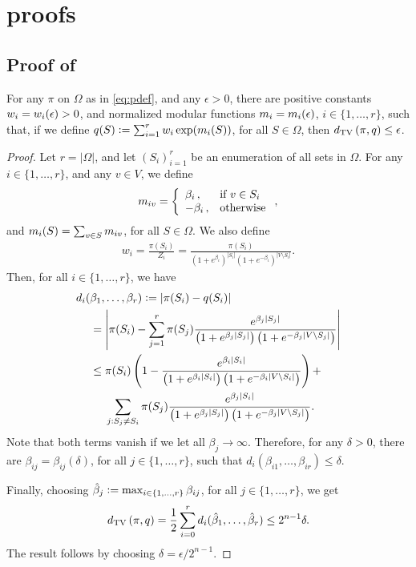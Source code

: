 \chapter{\Ms{} proofs}

\section{Proof of }

\setcounter{lemma}{0}
\begin{prop}
  For any $\pi$ on $\Omega$ as in \eqref{eq:pdef}, and any $\epsilon > 0$, there are positive constants $w_i = w_i(\epsilon) > 0$, and normalized modular functions $m_i = m_i(\epsilon)$, $i \in \{1, \ldots, r\}$, such that, if we define $q(S) \vcentcolon= \sum_{i = 1}^r w_i \exp(m_i(S))$, for all $S \in \Omega$, then $d_{\textrm{TV}}\left( \pi, q \right) \leq \epsilon$.
\end{prop}

\begin{proof}
  Let $r = |\Omega|$, and let $\left( S_i \right)_{i = 1}^r$ be an enumeration of all sets in $\Omega$.
  For any $i \in \{1, \ldots, r\}$, and any $v \in V$, we define
  \begin{align*}
    m_{iv} = \left\{ \begin{array}{ll} \beta_i\,,& \mbox{if } v \in S_i \\ -\beta_i\,,& \mbox{otherwise} \end{array} \right.,
  \end{align*}
  and $m_i(S) = \sum_{v \in S} m_{iv}$, for all $S \in \Omega$.
  We also define
  \begin{align*}
    w_i = \frac{\pi(S_i)}{Z_i} = \frac{\pi(S_i)}{\left(1 + e^{\beta_i}\right)^{|S_i|}\left(1 + e^{-\beta_i}\right)^{|V \setminus S_i|}}.
  \end{align*}
  Then, for all $i \in \{1, \ldots, r\}$, we have
  \begin{align*}
    d_i(&\beta_1, \ldots, \beta_r) \vcentcolon= |\pi(S_i) - q(S_i)| \\
      &= \left| \pi(S_i) - \sum_{j = 1}^r \pi(S_j) \frac{e^{\beta_j|S_j|}}{\left( 1 + e^{\beta_j|S_j|} \right) \left( 1 + e^{-\beta_j|V \setminus S_j|} \right)} \right| \\
      &\leq \pi(S_i) \left( 1 - \frac{e^{\beta_i|S_i|}}{\left( 1 + e^{\beta_i|S_i|} \right) \left( 1 + e^{-\beta_i|V \setminus S_i|} \right)} \right) +\\
      &\ \ \ \ \sum_{j : S_j \neq S_i} \pi(S_j) \frac{e^{\beta_j|S_i|}}{\left( 1 + e^{\beta_j|S_j|} \right) \left( 1 + e^{-\beta_j|V \setminus S_j|} \right)}.
  \end{align*}
  Note that both terms vanish if we let all $\beta_j \to \infty$.
  Therefore, for any $\delta > 0$, there are $\beta_{ij} = \beta_{ij}(\delta)$, for all $j \in \{1, \ldots, r\}$, such that $d_i(\beta_{i1}, \ldots, \beta_{ir}) \leq \delta$.
  
  Finally, choosing $\hat{\beta}_j \vcentcolon= \max_{i \in \{1, \ldots, r\}} \beta_{ij}$, for all $j \in \{1, \ldots, r\}$, we get
  \begin{align*}
    d_{\textrm{TV}}\left( \pi, q \right) = \frac{1}{2}\sum_{i = 0}^r d_i(\hat{\beta}_1, \ldots, \hat{\beta}_r) \leq 2^{n-1} \delta.
  \end{align*}
  The result follows by choosing $\delta = \epsilon / 2^{n-1}$.
\end{proof}

